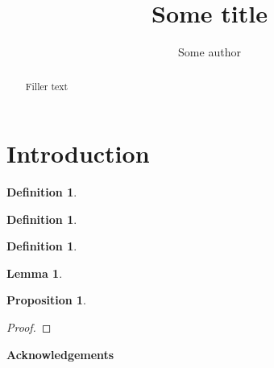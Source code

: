 \documentclass[a4paper]{amsart}
\title{Some title}
\author{Some author}
\newtheorem{prop}[theorem]{Proposition}
\newtheorem{lemma}[theorem]{Lemma}
\theoremstyle{remark}
\theoremstyle{definition}
\newtheorem{definition}[theorem]{Definition}
\begin{document}
\maketitle

\begin{abstract}
    Filler text
\end{abstract}

\section{Introduction}

\begin{definition}
    
\end{definition}

\begin{definition}
    
\end{definition}

\begin{definition}
    
\end{definition}


\begin{lemma}
    
\end{lemma}

\begin{prop}

\end{prop}
\begin{proof}
    
\end{proof}

\textbf{Acknowledgements}

\section{}

\section{}



\begin{thebibliography}
    
\end{thebibliography}
\end{document}

